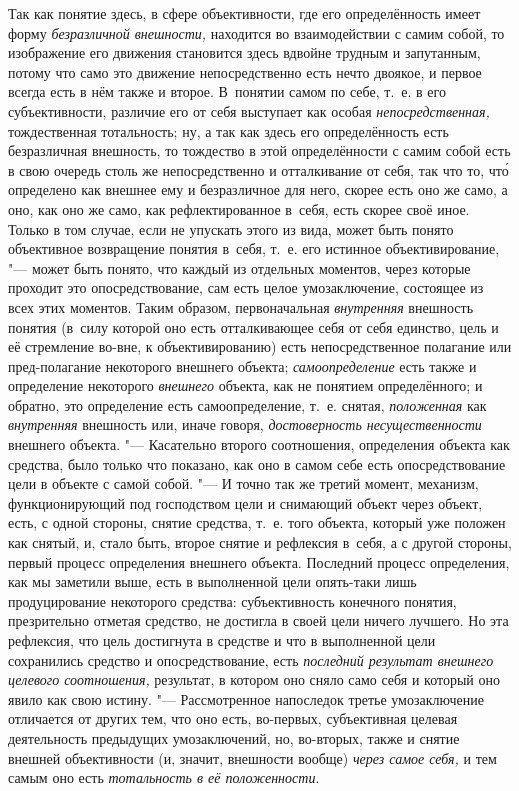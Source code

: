 Так как понятие здесь, в сфере объективности, где его определённость
имеет форму {\em безразличной внешности,}
находится во взаимодействии с самим собой, то изображение его
движения становится здесь вдвойне трудным и запутанным, потому что само это
движение непосредственно есть нечто двоякое, и первое всегда есть в нём
также и второе. В~понятии самом по себе, т.~е. в его субъективности,
различие его от себя выступает как особая {\em непосредственная,}
тождественная тотальность; ну, а так как здесь его
определённость есть безразличная внешность, то тождество в этой
определённости с самим собой есть в свою очередь столь же непосредственно и
отталкивание от себя, так что то, чт\'{о} определено как внешнее ему и
безразличное для него, скорее есть оно же само, а оно, как оно же само, как
рефлектированное в~себя, есть скорее своё иное. Только в том случае, если
не упускать этого из вида, может быть понято объективное возвращение
понятия в~себя, т.~е. его истинное объективирование, "--- может
быть понято, что каждый из отдельных моментов, через которые проходит это
опосредствование, сам есть целое умозаключение, состоящее из всех этих
моментов. Таким образом, первоначальная
{\em внутренняя}
внешность понятия (в~силу которой оно есть отталкивающее себя
от себя единство, цель и её стремление во-вне, к объективированию) есть
непосредственное полагание или пред-полагание некоторого внешнего объекта;
{\em самоопределение}
есть также и определение некоторого
{\em внешнего} объекта,
как не понятием определённого; и обратно, это определение есть
самоопределение, т.~е. снятая,
{\em положенная} как
{\em внутренняя}
внешность или, иначе говоря,
{\em достоверность несущественности}
внешнего объекта. "--- Касательно второго
соотношения, определения объекта как средства, было только что показано,
как оно в самом себе есть опосредствование цели в объекте с самой собой. "---
И точно так же третий момент, механизм, функционирующий под
господством цели и снимающий объект через объект, есть, с одной стороны,
снятие средства, т.~е. того объекта, который уже положен как снятый, и,
стало быть, второе снятие и рефлексия в~себя, а с другой стороны, первый
процесс определения внешнего объекта. Последний процесс определения, как мы
заметили выше, есть в выполненной цели опять-таки лишь
продуцирование некоторого средства: субъективность конечного понятия,
презрительно отметая средство, не достигла в своей цели ничего лучшего. Но
эта рефлексия, что цель достигнута в средстве и что в выполненной цели
сохранились средство и опосредствование, есть
{\em последний результат внешнего
целевого соотношения,} результат, в котором оно сняло само
себя и который оно явило как свою истину. "--- Рассмотренное
напоследок третье умозаключение отличается от других тем, что оно есть,
во-первых, субъективная целевая деятельность предыдущих умозаключений, но,
во-вторых, также и снятие внешней объективности (и, значит, внешности
вообще) {\em через самое себя,}
и тем самым оно есть
{\em тотальность в её положенности}.


